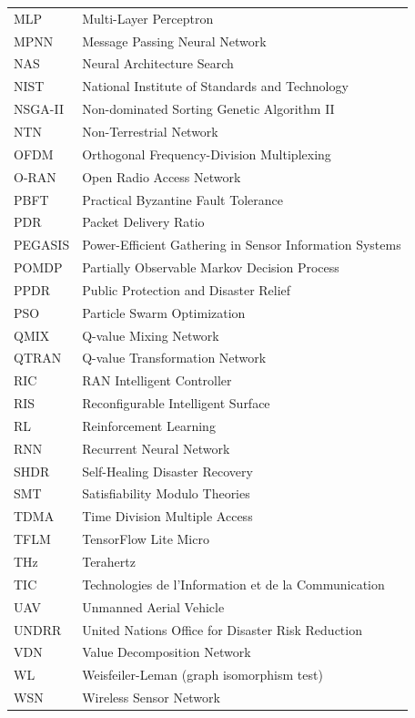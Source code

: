 \begin{longtable}{lp{5in}}
MLP        & Multi-Layer Perceptron\\
MPNN       & Message Passing Neural Network\\
NAS        & Neural Architecture Search\\
NIST       & National Institute of Standards and Technology\\
NSGA-II    & Non-dominated Sorting Genetic Algorithm II\\
NTN        & Non-Terrestrial Network\\
OFDM       & Orthogonal Frequency-Division Multiplexing\\
O-RAN      & Open Radio Access Network\\
PBFT       & Practical Byzantine Fault Tolerance\\
PDR        & Packet Delivery Ratio\\
PEGASIS    & Power-Efficient Gathering in Sensor Information Systems\\
POMDP      & Partially Observable Markov Decision Process\\
PPDR       & Public Protection and Disaster Relief\\
PSO        & Particle Swarm Optimization\\
QMIX       & Q-value Mixing Network\\
QTRAN      & Q-value Transformation Network\\
RIC        & RAN Intelligent Controller\\
RIS        & Reconfigurable Intelligent Surface\\
RL         & Reinforcement Learning\\
RNN        & Recurrent Neural Network\\
SHDR       & Self-Healing Disaster Recovery\\
SMT        & Satisfiability Modulo Theories\\
TDMA       & Time Division Multiple Access\\
TFLM       & TensorFlow Lite Micro\\
THz        & Terahertz\\
TIC        & Technologies de l'Information et de la Communication\\
UAV        & Unmanned Aerial Vehicle\\
UNDRR      & United Nations Office for Disaster Risk Reduction\\
VDN        & Value Decomposition Network\\
WL         & Weisfeiler-Leman (graph isomorphism test)\\
WSN        & Wireless Sensor Network\\
\end{longtable}

